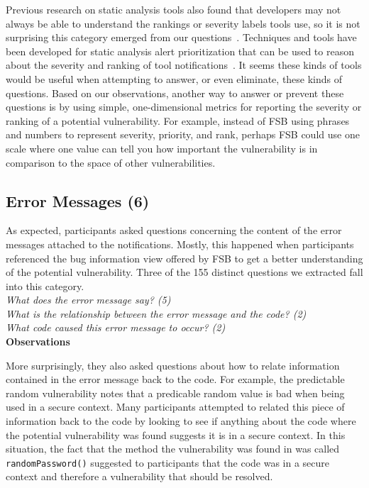 \documentclass[conference]{IEEEtran}
\begin{document}
Previous research on static analysis tools also found that developers may not always be able to understand the rankings or severity labels tools use, so it is not surprising this category emerged from our questions~\cite{johnson2013don}.
Techniques and tools have been developed for static analysis alert prioritization that can be used to reason about the severity and ranking of tool notifications~\cite{kim2007prioritizing, boogerd2006prioritizing, kremenek2004correlation}.
It seems these kinds of tools would be useful when attempting to answer, or even eliminate, these kinds of questions. 
Based on our observations, another way to answer or prevent these questions is by using simple, one-dimensional metrics for reporting the severity or ranking of a potential vulnerability.
For example, instead of FSB using phrases and numbers to represent severity, priority, and rank, perhaps FSB could use one scale where one value can tell you how important the vulnerability is in comparison to the space of other vulnerabilities.


\noindent\subsection{\textbf{Error Messages (6)}}\label{em}

As expected, participants asked questions concerning the content of the error messages attached to the notifications. 
Mostly, this happened when participants referenced the bug information view offered by FSB to get a better understanding of the potential vulnerability.
Three of the 155 distinct questions we extracted fall into this category.
\\

\noindent\emph{What does the error message say? (5)} \\
\emph{What is the relationship between the error message and the code? (2)} \\
\emph{What code caused this error message to occur? (2)} \\

\noindent\textbf{Observations}

More surprisingly, they also asked questions about how to relate information contained in the error message back to the code. 
For example, the predictable random vulnerability notes that a predicable random value is bad when being used in a secure context. 
Many participants attempted to related this piece of information back to the code by looking to see if anything about the code where the potential vulnerability was found suggests it is in a secure context. 
In this situation, the fact that the method the vulnerability was found in was called \texttt{randomPassword()} suggested to participants that the code was in a secure context and therefore a vulnerability that should be resolved.
\end{document}
